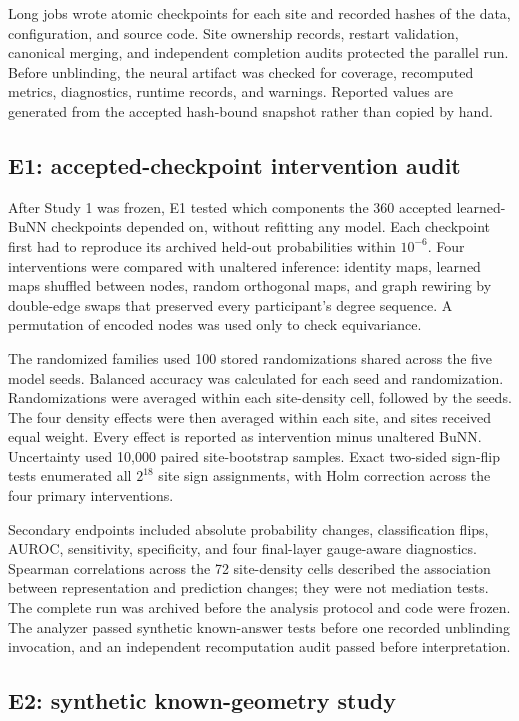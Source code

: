 \documentclass[11pt,a4paper]{article}
\begin{document}
Long jobs wrote atomic checkpoints for each site and recorded hashes of the
data, configuration, and source code. Site ownership records, restart
validation, canonical merging, and independent completion audits protected the
parallel run. Before unblinding, the neural artifact was checked for coverage,
recomputed metrics, diagnostics, runtime records, and warnings. Reported values
are generated from the accepted hash-bound snapshot rather than copied by hand.

\subsection{E1: accepted-checkpoint intervention audit}

After Study 1 was frozen, E1 tested which components the 360 accepted
learned-BuNN checkpoints depended on, without refitting any model. Each
checkpoint first had to reproduce its archived held-out probabilities within
$10^{-6}$. Four interventions were compared with unaltered inference: identity
maps, learned maps shuffled between nodes, random orthogonal maps, and graph
rewiring by double-edge swaps that preserved every participant's degree
sequence. A permutation of encoded nodes was used only to check equivariance.

The randomized families used 100 stored randomizations shared across the five
model seeds. Balanced accuracy was calculated for each seed and randomization.
Randomizations were averaged within each site-density cell, followed by the
seeds. The four density effects were then averaged within each site, and sites
received equal weight. Every effect is reported as intervention minus
unaltered BuNN. Uncertainty used 10,000 paired site-bootstrap samples. Exact
two-sided sign-flip tests enumerated all $2^{18}$ site sign assignments, with
Holm correction across the four primary interventions.

Secondary endpoints included absolute probability changes, classification
flips, AUROC, sensitivity, specificity, and four final-layer gauge-aware
diagnostics. Spearman correlations across the 72 site-density cells described
the association between representation and prediction changes; they were not
mediation tests. The complete run was archived before the analysis protocol
and code were frozen. The analyzer passed synthetic known-answer tests before
one recorded unblinding invocation, and an independent recomputation audit
passed before interpretation.

\subsection{E2: synthetic known-geometry study}
\end{document}
